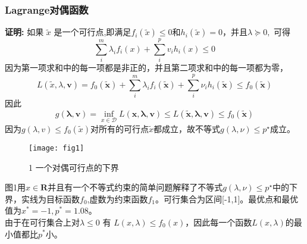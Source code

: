 \documentclass[handout,10pt]{beamer}
\begin{document}
\begin{frame}

      \frametitle{Lagrange对偶函数}
\textbf{证明:}
		如果 $\tilde{x}$ 是一个可行点,即满足${f_{i}(\tilde{x})\leqslant0\mathrm{和}h_{i}(\tilde{x})=0}$，并且$\lambda \succeq 0,$ 可得
\begin{equation}
\sum_{i}^{m}\lambda_{i}f_{i}(x)+\sum_{i}^{p}v_{i}h_{i}(x)\leqslant0
\end{equation}
因为第一项求和中的每一项都是非正的，并且第二项求和中的每一项都为零，
	\begin{equation}
		L(\tilde{x},\lambda,\boldsymbol{v})=f_{0}(\tilde{\boldsymbol{x}})+\sum_{i}^{m}\lambda_{i}f_{i}(\tilde{\boldsymbol{x}})+\sum_{i}^{p}\nu_{i}h_{i}(\tilde{\boldsymbol{x}})\leqslant f_{0}(\tilde{\boldsymbol{x}})
	\end{equation}
因此
\begin{equation}
g(\boldsymbol{\lambda},\boldsymbol{v})=\inf_{x\in\mathcal{D}}L(\boldsymbol{x},\boldsymbol{\lambda},\boldsymbol{v})\leqslant L(\tilde{\boldsymbol{x}},\boldsymbol{\lambda},\boldsymbol{v})\leqslant f_0(\tilde{\boldsymbol{x}})
\end{equation}
因为${g(\lambda,v)\leqslant f_{0}(\tilde{x})}$对所有的可行点${\tilde{x}}$都成立，故不等式$g(\lambda, \nu) \leq p^{\star}$成立。


\end{frame}


\begin{frame}

\begin{figure}
\texttt{[image: fig1]}
\caption{1 一个对偶可行点的下界}
\end{figure}
      图1用$x\in\mathbf{R}$并且有一个不等式约束的简单问题解释了不等式$g(\lambda, \nu) \leq p^{\star}$中的下界，实线为目标函数$f_{0}$,虚数为约束函数$f_{1}$。可行集合为区间[-1,1]。最优点和最优值为$x^{*}=-1,p^{*}=1.08$。\\
由于在可行集合上对$\lambda\leqslant0\text{ 有 }L(x,\lambda)\leqslant f_{0}(x)$，因此每一个函数$L(x,\lambda)$的最小值都比$p^{*}$小。




\end{frame}
\end{document}
